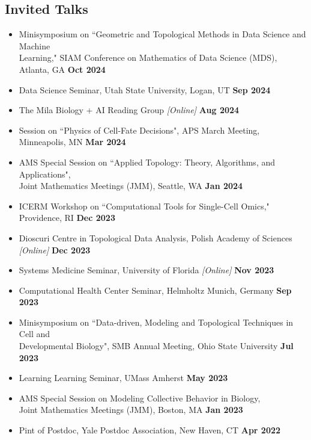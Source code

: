\documentclass[margin,line]{res}
\begin{document}
\begin{resume}
\section{\sc Invited Talks}
{\renewcommand\leftmargini{0em}
\begin{itemize}
\setlength\itemsep{0.2em}
\item[] Minisymposium on ``Geometric and Topological Methods in Data Science and Machine\\ Learning," SIAM Conference on Mathematics of Data Science (MDS), Atlanta, GA \hfill {\bf \small Oct 2024}
\item[] Data Science Seminar, Utah State University, Logan, UT \hfill {\bf \small Sep 2024}
\item[] The Mila Biology + AI Reading Group \textit{[Online]} \hfill {\bf \small Aug 2024}
\item[] Session on ``Physics of Cell-Fate Decisions", APS March Meeting, Minneapolis, MN \hfill {\bf \small Mar 2024} 
\item[] AMS Special Session on ``Applied Topology: Theory, Algorithms, and Applications",\\Joint Mathematics Meetings (JMM), Seattle, WA \hfill {\bf \small Jan 2024} 
\item[] ICERM Workshop on ``Computational Tools for Single-Cell Omics," Providence, RI \hfill {\bf \small Dec 2023} 
\item[] Dioscuri Centre in Topological Data Analysis, Polish Academy of Sciences \textit{[Online]} \hfill {\bf \small Dec 2023}
\item[] Systems Medicine Seminar, University of Florida \textit{[Online]} \hfill {\bf \small Nov 2023}
\item[] Computational Health Center Seminar, Helmholtz Munich, Germany \hfill {\bf \small Sep 2023}
\item[] Minisymposium on ``Data-driven, Modeling and Topological Techniques in Cell and \\Developmental Biology", SMB Annual Meeting, Ohio State University \hfill {\bf \small Jul 2023}
\item[] Learning Learning Seminar, UMass Amherst \hfill {\bf \small May 2023}
\item[] AMS Special Session on Modeling Collective Behavior in Biology,\\Joint Mathematics Meetings (JMM), Boston, MA \hfill {\bf \small Jan 2023}
\item[] Pint of Postdoc, Yale Postdoc Association, New Haven, CT \hfill {\bf \small Apr 2022}

\end{itemize}}
\end{resume}
\end{document}
